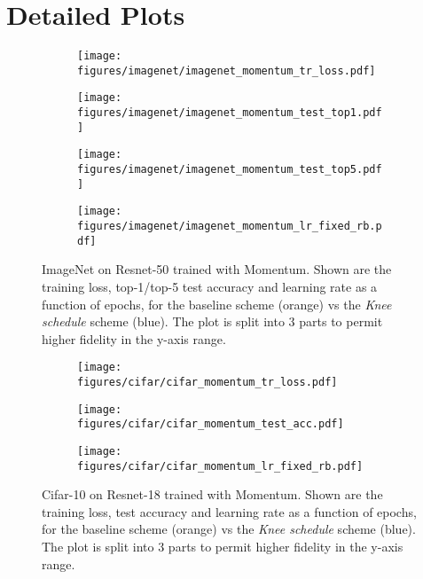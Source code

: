 \documentclass{article} \usepackage{iclr2021_conference,times}
\newcommand{\lrschedule}{\textit{Knee schedule}}
\begin{document}
\section{Detailed Plots}


\begin{figure}[h]
    \centering
    \begin{subfigure}[t]{0.88\textwidth}
        \centering
        \texttt{[image: figures/imagenet/imagenet\_momentum\_tr\_loss.pdf]}
        \label{fig:imagenet_momentum_tr_loss}
    \end{subfigure}
    \begin{subfigure}[t]{0.88\textwidth}
        \centering
        \texttt{[image: figures/imagenet/imagenet\_momentum\_test\_top1.pdf]}
        \label{fig:imagenet_momentum_test_top1_acc}
    \end{subfigure}
    \begin{subfigure}[t]{0.88\textwidth}
        \centering
        \texttt{[image: figures/imagenet/imagenet\_momentum\_test\_top5.pdf]}
        \label{fig:imagenet_momentum_test_top5_acc}
    \end{subfigure}
    \begin{subfigure}[t]{0.88\textwidth}
        \centering
        \texttt{[image: figures/imagenet/imagenet\_momentum\_lr\_fixed\_rb.pdf]}
        \label{fig:imagenet_momentum_lr}
    \end{subfigure}
\caption{ImageNet on Resnet-50 trained with Momentum. Shown are the training loss, top-1/top-5 test accuracy and learning rate as a function of epochs, for the baseline scheme (orange) vs the \lrschedule{} scheme (blue). The plot is split into 3 parts to permit higher fidelity in the y-axis range.}
\label{fig:imagenet_momentum_result}
\end{figure}


\begin{figure}[h]
    \begin{subfigure}[t]{\textwidth}
        \centering
        \texttt{[image: figures/cifar/cifar\_momentum\_tr\_loss.pdf]}
        \label{fig:cifar_momentum_tr_loss}
    \end{subfigure}
    \begin{subfigure}[t]{\textwidth}
        \centering
        \texttt{[image: figures/cifar/cifar\_momentum\_test\_acc.pdf]}
        \label{fig:cifar_momentum_test_acc}
    \end{subfigure}
    \begin{subfigure}[t]{\textwidth}
        \centering
        \texttt{[image: figures/cifar/cifar\_momentum\_lr\_fixed\_rb.pdf]}
        \label{fig:cifar_momentum_lr}
    \end{subfigure}
\caption{Cifar-10 on Resnet-18 trained with Momentum. Shown are the training loss, test accuracy and learning rate as a function of epochs, for the baseline scheme (orange) vs the \lrschedule{} scheme (blue). The plot is split into 3 parts to permit higher fidelity in the y-axis range.}
\label{fig:cifar_momentum_result}
\end{figure}
\end{document}
